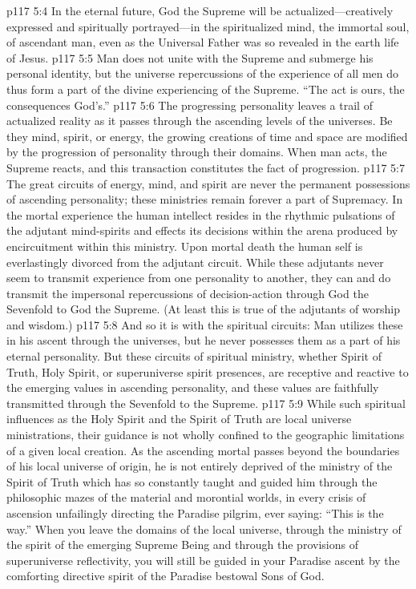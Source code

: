 \vs p117 5:4 In the eternal future, God the Supreme will be actualized---creatively expressed and spiritually portrayed---in the spiritualized mind, the immortal soul, of ascendant man, even as the Universal Father was so revealed in the earth life of Jesus.
\pc \vs p117 5:5 Man does not unite with the Supreme and submerge his personal identity, but the universe repercussions of the experience of all men do thus form a part of the divine experiencing of the Supreme. “The act is ours, the consequences God’s.”
\vs p117 5:6 The progressing personality leaves a trail of actualized reality as it passes through the ascending levels of the universes. Be they mind, spirit, or energy, the growing creations of time and space are modified by the progression of personality through their domains. When man acts, the Supreme reacts, and this transaction constitutes the fact of progression.
\vs p117 5:7 The great circuits of energy, mind, and spirit are never the permanent possessions of ascending personality; these ministries remain forever a part of Supremacy. In the mortal experience the human intellect resides in the rhythmic pulsations of the adjutant mind\hyp{}spirits and effects its decisions within the arena produced by encircuitment within this ministry. Upon mortal death the human self is everlastingly divorced from the adjutant circuit. While these adjutants never seem to transmit experience from one personality to another, they can and do transmit the impersonal repercussions of decision\hyp{}action through God the Sevenfold to God the Supreme. (At least this is true of the adjutants of worship and wisdom.)\plusone
\vs p117 5:8 And so it is with the spiritual circuits: Man utilizes these in his ascent through the universes, but he never possesses them as a part of his eternal personality. But these circuits of spiritual ministry, whether Spirit of Truth, Holy Spirit, or superuniverse spirit presences, are receptive and reactive to the emerging values in ascending personality, and these values are faithfully transmitted through the Sevenfold to the Supreme.
\pc \vs p117 5:9 While such spiritual influences as the Holy Spirit and the Spirit of Truth are local universe ministrations, their guidance is not wholly confined to the geographic limitations of a given local creation. As the ascending mortal passes beyond the boundaries of his local universe of origin, he is not entirely deprived of the ministry of the Spirit of Truth which has so constantly taught and guided him through the philosophic mazes of the material and morontial worlds, in every crisis of ascension unfailingly directing the Paradise pilgrim, ever saying: “This is the way.” When you leave the domains of the local universe, through the ministry of the spirit of the emerging Supreme Being and through the provisions of superuniverse reflectivity, you will still be guided in your Paradise ascent by the comforting directive spirit of the Paradise bestowal Sons of God.
